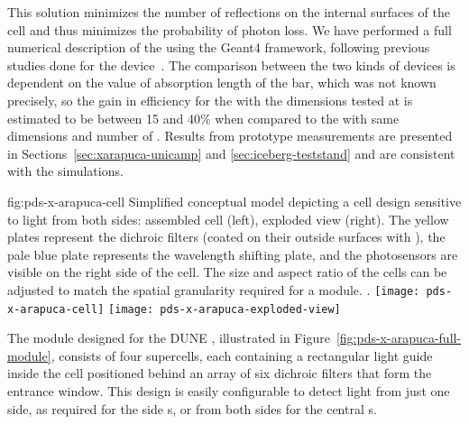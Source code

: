 This solution minimizes the number of reflections on the internal surfaces of the cell and thus minimizes the probability of photon loss. 
We have performed a full numerical description of the  using the Geant4 framework, following previous studies done for the  device~\cite{Marinho:2018doi}.  The comparison between the two kinds of devices is dependent on the value of absorption length of the bar, which was not known precisely, so the gain in efficiency for the  with the dimensions tested at  is estimated to be between 15 and 40\% when compared to the  with same dimensions and number of .
Results from prototype measurements are presented in Sections~\ref{sec:xarapuca-unicamp} and \ref{sec:iceberg-teststand} and are consistent with the simulations.

 \begin{dunefigure}{fig:pds-x-arapuca-cell}
{Simplified conceptual model depicting a  cell design sensitive to light from both sides: assembled cell (left),  exploded view (right). The yellow plates represent the dichroic filters (coated on their outside surfaces with  ), the pale blue plate represents the wavelength shifting plate, and the photosensors are visible on the right side of the cell. The size and aspect ratio of the cells can be adjusted to match the spatial granularity required for a  module. .
} 
  \texttt{[image: pds-x-arapuca-cell]}
  \texttt{[image: pds-x-arapuca-exploded-view]}
\end{dunefigure}

The   module designed for the DUNE , illustrated in Figure~\ref{fig:pds-x-arapuca-full-module}, consists of four supercells, each containing a rectangular 
light guide inside the cell positioned behind an array of six dichroic filters that form the entrance window.  
This design is easily configurable to detect light from just one side, as required for the side s, or from both sides for the central s. 

